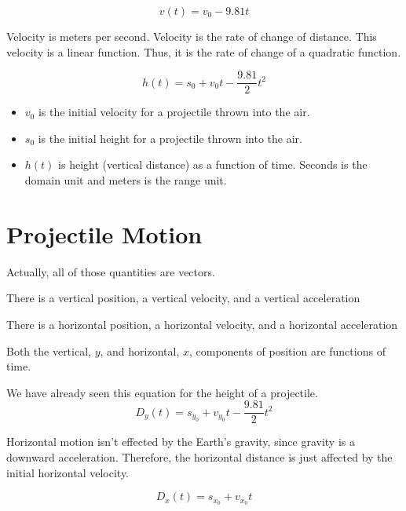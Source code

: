 \documentclass{ximera}
\begin{document}
\[ v(t) = v_0 - 9.81 t  \]



Velocity is meters per second. Velocity is the rate of change of distance.  This velocity is a linear function. Thus, it is the rate of change of a quadratic function.




\[ h(t) = s_0 + v_0 t - \frac{9.81}{2} t^2  \]



\begin{itemize}
\item $v_0$ is the initial velocity for a projectile thrown into the air. \\

\item $s_0$ is the initial height for a projectile thrown into the air. \\

\item $h(t)$ is height (vertical distance) as a function of time.  Seconds is the domain unit and meters is the range unit.
\end{itemize}



\section{Projectile Motion}


Actually, all of those quantities are vectors.  

\begin{observation}
\item There is a vertical position, a vertical velocity, and a vertical acceleration
\item There is a horizontal position, a horizontal velocity, and a horizontal acceleration
\end{observation}



Both the vertical, $y$, and horizontal, $x$, components of position are functions of time.

We have already seen this equation for the height of a projectile.
\[ D_y(t) = s_{y_0} + v_{y_0} t - \frac{9.81}{2} t^2  \]

Horizontal motion isn't effected by the Earth's gravity, since gravity is a downward acceleration. Therefore, the horizontal distance is just affected by the initial horizontal velocity.


\[ D_x(t) = s_{x_0} + v_{x_0} t  \]
\end{document}
